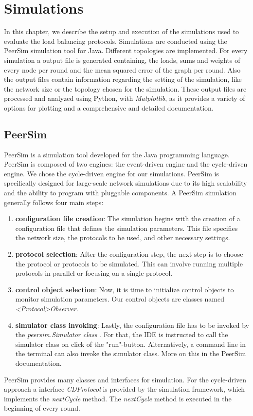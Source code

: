 \chapter{Simulations}\label{chap:simulations}
In this chapter, we describe the setup and execution of the simulations used to evaluate the load balancing protocols. Simulations are conducted using the PeerSim simulation tool for Java. Different topologies are implemented. For every simulation a output file is generated containing, the loads, sums and weights of every node per round and the mean squared error of the graph per round. Also the output files contain information regarding the setting of the simulation, like the network size or the topology chosen for the simulation. These output files are processed and analyzed using Python, with \textit{Matplotlib}, as it provides a variety of options for plotting and a comprehensive and detailed documentation.

\section{PeerSim}
PeerSim is a simulation tool developed for the Java programming language. PeerSim is composed of two engines: the event-driven engine and the cycle-driven engine. We chose the cycle-driven engine for our simulations. PeerSim is specifically designed for large-scale network simulations due to its high scalability and the ability to program with pluggable components. A PeerSim simulation generally follows four main steps:
\begin{enumerate}
    \item \textbf{configuration file creation}: The simulation begins with the creation of a configuration file that defines the simulation parameters. This file specifies the network size, the protocols to be used, and other necessary settings.
    \item \textbf{protocol selection}: After the configuration step, the next step is to choose the protocol or protocols to be simulated. This can involve running multiple protocols in parallel or focusing on a single protocol.
    \item \textbf{control object selection}: Now, it is time to initialize control objects to monitor simulation parameters. Our control objects are classes named \textit{<Protocol>Observer}.
    \item \textbf{simulator class invoking}: Lastly, the configuration file has to be invoked by the \textit{peersim.Simulator class} \cite{peersimdocs}. For that, the IDE is instructed to call the simulator class on click of the "run"-button. Alternatively, a command line in the terminal can also invoke the simulator class. More on this in the PeerSim documentation.
\end{enumerate}
PeerSim provides many classes and interfaces for simulation. For the cycle-driven approach a interface \textit{CDProtocol} is provided by the simulation framework, which implements the \textit{nextCycle} method. The \textit{nextCycle} method is executed in the beginning of every round.

